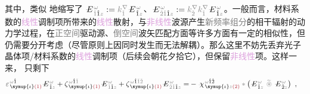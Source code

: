其中，类似  地缩写了 $\Xint{\mathcolor{gray}{-}}{25}{E}^{\;\!\mathcolor{gray}{\omega}}_{\;\! \mathcolor{gray}{\check{1}} \hat{1} \mathcolor{gray}{z}} := \mathcolor{gray}{k^\nabla_{\check{1}}} \Xint{\mathcolor{gray}{-}}{25}{E}^{\;\!\mathcolor{gray}{\omega}}_{\;\! \hat{1} \mathcolor{gray}{z}}$、$\Xint{\mathcolor{gray}{-}}{25}{E}^{\;\!\mathcolor{gray}{\omega}}_{\;\! \mathcolor{gray}{\check{2} \check{1}} \hat{1} \mathcolor{gray}{z}} := \mathcolor{gray}{k^\nabla_{\check{2}}} \mathcolor{gray}{k^\nabla_{\check{1}}} \Xint{\mathcolor{gray}{-}}{25}{E}^{\;\!\mathcolor{gray}{\omega}}_{\;\! \hat{1} \mathcolor{gray}{z}}$。一般而言，材料系数的\textcolor{Plum}{线性}调制项所带来的\textcolor{Plum}{线性}散射，与\textcolor{Plum}{非线性}\textcolor{NavyBlue}{波源}产生\textcolor{gray}{新频率组分}的相干辐射的动力学过程，在\textcolor{gray}{正空间}\textcolor{NavyBlue}{驱动源}、\textcolor{gray}{倒空间}\textcolor{PineGreen}{波矢}匹配方面等许多方面有一定的相似性\cite{gerkeAperiodicVolumeOptics2010,chenQuasiphasematchingdivisionMultiplexingHolography2021b}，但仍需要分开考虑（尽管原则上因同时发生而无法解耦）。那么这里不妨先丢弃光子晶体项/材料系数的\textcolor{Plum}{线性}调制项（后续会朝花夕拾它），但保留\textcolor{Plum}{非线性}项。这样一来， 只剩下
\begin{align} \label{eq:nonlinear(2)-wave_wkrho-simplify5}
	\varepsilon^{\;\! \mathcolor{gray}{\omega} \hat{1}}_{\;\! \symup{\iota} \textcolor{Maroon}{(1)}} \Xint{\mathcolor{gray}{-}}{295}{E}^{\;\!\mathcolor{gray}{\omega}}_{\;\! \hat{1} \mathcolor{gray}{z}} + \zeta^{\;\! \mathcolor{gray}{\omega} \hat{1} \mathcolor{gray}{\check{1}}}_{\;\! \symup{\iota} \textcolor{Maroon}{(1)}} \Xint{\mathcolor{gray}{-}}{295}{E}^{\;\!\mathcolor{gray}{\omega}}_{\;\! \mathcolor{gray}{\check{1}} \hat{1} \mathcolor{gray}{z}} + \zeta^{\;\! \mathcolor{gray}{\omega} \hat{1} \mathcolor{gray}{\check{1} \check{2}}}_{\;\! \symup{\iota} \textcolor{Maroon}{(1)}} \Xint{\mathcolor{gray}{-}}{295}{E}^{\;\!\mathcolor{gray}{\omega}}_{\;\! \mathcolor{gray}{\check{2} \check{1}} \hat{1} \mathcolor{gray}{z}}
	= &- \Xint{{}^{}_{\mathcolor{gray}{-}}}{23}{\chi}^{\;\! \mathcolor{gray}{\omega} \hat{1} \hat{2}}_{\;\! \symup{\iota} \mathcolor{gray}{z} \textcolor{Maroon}{(2)}} \mathcolor{gray}{*} \left( \Xint{\mathcolor{gray}{-}}{295}{E}^{\;\!\mathcolor{gray}{\omega}}_{\;\! \hat{1} \mathcolor{gray}{z}} ~\mathcolor{gray}{\widetilde \circledast}~ \Xint{\mathcolor{gray}{-}}{295}{E}^{\;\!\mathcolor{gray}{\omega}}_{\;\! \hat{2} \mathcolor{gray}{z}} \right) ~,
\end{align}
